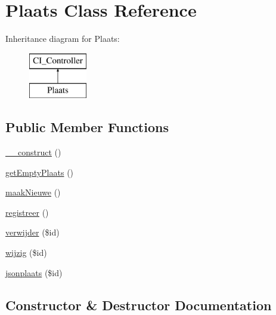 \hypertarget{class_plaats}{}\section{Plaats Class Reference}
\label{class_plaats}
Inheritance diagram for Plaats\+:\begin{figure}[H]
\begin{center}
\leavevmode
\includegraphics[height=2.000000cm]{class_plaats}
\end{center}
\end{figure}
\subsection*{Public Member Functions}
\begin{DoxyCompactItemize}
\item 
\mbox{\hyperlink{class_plaats_a095c5d389db211932136b53f25f39685}{\+\_\+\+\_\+construct}} ()
\item 
\mbox{\hyperlink{class_plaats_a3a5c8647f1efcdff577c49894a2bdde8}{get\+Empty\+Plaats}} ()
\item 
\mbox{\hyperlink{class_plaats_a7e7e04e0718668180cf4e8fb0b4dea9b}{maak\+Nieuwe}} ()
\item 
\mbox{\hyperlink{class_plaats_a6db5689af94fb09c1652e5f3b1d2770a}{registreer}} ()
\item 
\mbox{\hyperlink{class_plaats_aa5997c2d1474e374ea50a87e8673d2e4}{verwijder}} (\$id)
\item 
\mbox{\hyperlink{class_plaats_aa10f6589c4f171a54524ed6758bed97f}{wijzig}} (\$id)
\item 
\mbox{\hyperlink{class_plaats_aeac29d4165c8a50a862fe3e8df220376}{jsonplaats}} (\$id)
\end{DoxyCompactItemize}


\subsection{Constructor \& Destructor Documentation}
\mbox{\label{class_plaats_a095c5d389db211932136b53f25f39685}} 
